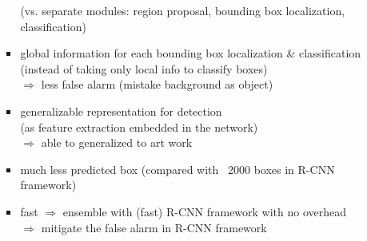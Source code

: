\begin{itemize}
\begin{itemize}
\begin{itemize}
		(vs. separate modules: region proposal, bounding box localization, classification)
		\item global information for each bounding box localization \& classification \\
		(instead of taking only local info to classify boxes) \\
		$\Rightarrow$ less false alarm (mistake background as object)
		\item generalizable representation for detection \\
		(as feature extraction embedded in the network) \\
		$\Rightarrow$ able to generalized to art work
		\item much less predicted box (compared with ~2000 boxes in R-CNN framework)
		\item fast $\Rightarrow$ ensemble with (fast) R-CNN framework with no overhead \\
		$\Rightarrow$ mitigate the false alarm in R-CNN framework
		\end{itemize}
	\end{itemize}


\end{itemize}
